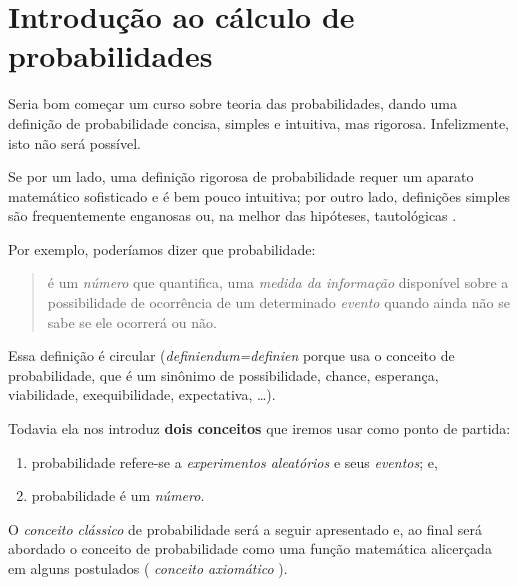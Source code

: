 \documentclass[
]{book}
\providecommand{\tightlist}{%
  \setlength{\itemsep}{0pt}\setlength{\parskip}{0pt}}
\begin{document}
\hypertarget{introduuxe7uxe3o-ao-cuxe1lculo-de-probabilidades}{%
\chapter{Introdução ao cálculo de probabilidades}\label{introduuxe7uxe3o-ao-cuxe1lculo-de-probabilidades}}

Seria bom começar um curso sobre teoria das probabilidades, dando uma definição de probabilidade concisa, simples e intuitiva, mas rigorosa. Infelizmente, isto não será possível.

\hfill\break

Se por um lado, uma definição rigorosa de probabilidade requer um aparato matemático sofisticado e é bem pouco intuitiva; por outro lado, definições simples são frequentemente enganosas ou, na melhor das hipóteses, tautológicas .

\hfill\break

Por exemplo, poderíamos dizer que probabilidade:

\hfill\break

\begin{quote}
é um \emph{número} que quantifica, uma \emph{medida da informação} disponível sobre a possibilidade de ocorrência de um determinado \emph{evento} quando ainda não se sabe se ele ocorrerá ou não.
\end{quote}

\hfill\break

Essa definição é circular (\emph{definiendum=definien} porque usa o conceito de probabilidade, que é um sinônimo de possibilidade, chance, esperança, viabilidade, exequibilidade, expectativa, \dots).

\hfill\break

Todavia ela nos introduz \textbf{dois conceitos} que iremos usar como ponto de partida:

\hfill\break

\begin{enumerate}
\def\labelenumi{\arabic{enumi}.}
\tightlist
\item
  probabilidade refere-se a \emph{experimentos aleatórios} e seus \emph{eventos}; e,
\item
  probabilidade é um \emph{número}.
\end{enumerate}

\hfill\break

O \emph{conceito clássico} de probabilidade será a seguir apresentado e, ao final será abordado o conceito de probabilidade como uma função matemática alicerçada em alguns postulados ( \emph{conceito axiomático} ).
\end{document}
